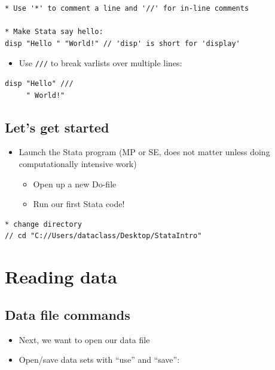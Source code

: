 \documentclass[]{book}
\providecommand{\tightlist}{%
  \setlength{\itemsep}{0pt}\setlength{\parskip}{0pt}}
\begin{document}
\begin{verbatim}
* Use '*' to comment a line and '//' for in-line comments

* Make Stata say hello:
disp "Hello " "World!" // 'disp' is short for 'display'
\end{verbatim}

\begin{itemize}
\tightlist
\item
  Use \texttt{///} to break varlists over multiple lines:
\end{itemize}

\begin{verbatim}
disp "Hello" ///
     " World!"
\end{verbatim}

\subsection{Let's get started}\label{lets-get-started}

\begin{itemize}
\tightlist
\item
  Launch the Stata program (MP or SE, does not matter unless doing
  computationally intensive work)

  \begin{itemize}
  \tightlist
  \item
    Open up a new Do-file
  \item
    Run our first Stata code!
  \end{itemize}
\end{itemize}

\begin{verbatim}
* change directory
// cd "C://Users/dataclass/Desktop/StataIntro"
\end{verbatim}

\section{Reading data}\label{reading-data-2}

\subsection{Data file commands}\label{data-file-commands}

\begin{itemize}
\tightlist
\item
  Next, we want to open our data file
\item
  Open/save data sets with ``use'' and ``save'':
\end{itemize}
\end{document}
